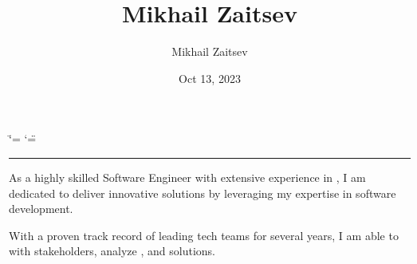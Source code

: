 \documentclass[letterpaper,10pt,english]{sphinxmanual}
\title{Mikhail Zaitsev}
\date{Oct 13, 2023}
\author{Mikhail Zaitsev}
\begin{document}
\ifdefined\shorthandoff
  \ifnum\catcode`\=\string=\active\shorthandoff{=}\fi
  \ifnum\catcode`\"=\active{}\fi
\fi

\pagestyle{empty}
\sphinxmaketitle
\pagestyle{plain}
\sphinxtableofcontents
\pagestyle{normal}
\label{\detokenize{index::doc}}



\bigskip\hrule\bigskip


\sphinxAtStartPar
As a highly skilled  Software Engineer with extensive experience
in ,
I am dedicated to deliver innovative solutions by leveraging my expertise in software development.

\sphinxAtStartPar
With a proven track record of leading tech teams for several years,
I am able to  with stakeholders, analyze ,
and  solutions.
\end{document}
